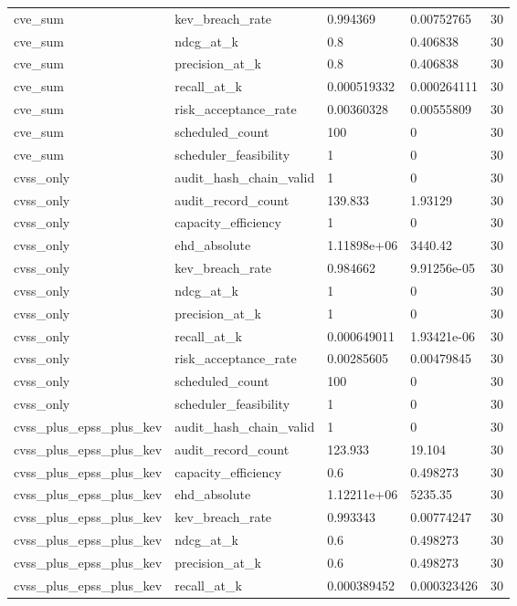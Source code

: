 \begin{tabular}{l l l l l}
cve\_sum & kev\_breach\_rate & 0.994369 & 0.00752765 & 30 \\
cve\_sum & ndcg\_at\_k & 0.8 & 0.406838 & 30 \\
cve\_sum & precision\_at\_k & 0.8 & 0.406838 & 30 \\
cve\_sum & recall\_at\_k & 0.000519332 & 0.000264111 & 30 \\
cve\_sum & risk\_acceptance\_rate & 0.00360328 & 0.00555809 & 30 \\
cve\_sum & scheduled\_count & 100 & 0 & 30 \\
cve\_sum & scheduler\_feasibility & 1 & 0 & 30 \\
cvss\_only & audit\_hash\_chain\_valid & 1 & 0 & 30 \\
cvss\_only & audit\_record\_count & 139.833 & 1.93129 & 30 \\
cvss\_only & capacity\_efficiency & 1 & 0 & 30 \\
cvss\_only & ehd\_absolute & 1.11898e+06 & 3440.42 & 30 \\
cvss\_only & kev\_breach\_rate & 0.984662 & 9.91256e-05 & 30 \\
cvss\_only & ndcg\_at\_k & 1 & 0 & 30 \\
cvss\_only & precision\_at\_k & 1 & 0 & 30 \\
cvss\_only & recall\_at\_k & 0.000649011 & 1.93421e-06 & 30 \\
cvss\_only & risk\_acceptance\_rate & 0.00285605 & 0.00479845 & 30 \\
cvss\_only & scheduled\_count & 100 & 0 & 30 \\
cvss\_only & scheduler\_feasibility & 1 & 0 & 30 \\
cvss\_plus\_epss\_plus\_kev & audit\_hash\_chain\_valid & 1 & 0 & 30 \\
cvss\_plus\_epss\_plus\_kev & audit\_record\_count & 123.933 & 19.104 & 30 \\
cvss\_plus\_epss\_plus\_kev & capacity\_efficiency & 0.6 & 0.498273 & 30 \\
cvss\_plus\_epss\_plus\_kev & ehd\_absolute & 1.12211e+06 & 5235.35 & 30 \\
cvss\_plus\_epss\_plus\_kev & kev\_breach\_rate & 0.993343 & 0.00774247 & 30 \\
cvss\_plus\_epss\_plus\_kev & ndcg\_at\_k & 0.6 & 0.498273 & 30 \\
cvss\_plus\_epss\_plus\_kev & precision\_at\_k & 0.6 & 0.498273 & 30 \\
cvss\_plus\_epss\_plus\_kev & recall\_at\_k & 0.000389452 & 0.000323426 & 30 \\

\end{tabular}
